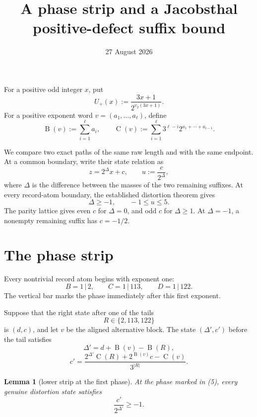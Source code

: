 \documentclass[11pt]{article}
\title{A phase strip and a Jacobsthal positive-defect suffix bound}
\author{}
\date{27 August 2026}
\newtheorem{lemma}[theorem]{Lemma}
\newcommand{\Up}{U_+}
\newcommand{\mass}{\operatorname{B}}
\newcommand{\car}{\operatorname{C}}
\begin{document}
\raggedbottom
\maketitle

For a positive odd integer \(x\), put
\[
 \Up(x):=\frac{3x+1}{2^{v_2(3x+1)}}.
 \tag{1}
\]
For a positive exponent word \(v=(a_1,\ldots,a_\ell)\), define
\[
 \mass(v):=\sum_{i=1}^{\ell}a_i,
 \qquad
 \car(v):=\sum_{i=1}^{\ell}
 3^{\ell-i}2^{a_1+\cdots+a_{i-1}}.
 \tag{2}
\]

We compare two exact paths of the same raw length and with the same
endpoint.  At a common boundary, write their state relation as
\[
 z=2^\Delta x+c,
 \qquad
 u:=\frac{c}{2^\Delta},
 \tag{3}
\]
where \(\Delta\) is the difference between the masses of the two
remaining suffixes.  At every record-atom boundary, the established
distortion theorem gives
\[
 \Delta\geq-1,
 \qquad
 -1\leq u\leq5.
 \tag{4}
\]
The parity lattice gives even \(c\) for \(\Delta=0\), and odd \(c\)
for \(\Delta\geq1\).  At \(\Delta=-1\), a nonempty remaining suffix
has \(c=-1/2\).

\section{The phase strip}

Every nontrivial record atom begins with exponent one:
\[
 B=1\,|\,2,\qquad
 C=1\,|\,113,\qquad
 D=1\,|\,122.
 \tag{5}
\]
The vertical bar marks the phase immediately after this first exponent.

Suppose that the right state after one of the tails
\[
 R\in\{2,113,122\}
 \tag{6}
\]
is \((d,c)\), and let \(v\) be the aligned alternative block.  The
state \((\Delta',c')\) before the tail satisfies
\[
 \Delta'=d+\mass(v)-\mass(R),
 \tag{7}
\]
\[
 c'=\frac{2^{\Delta'}\car(R)+2^{\mass(v)}c-\car(v)}
 {3^{|R|}}.
 \tag{8}
\]

\begin{lemma}[lower strip at the first phase]
At the phase marked in (5), every genuine distortion state satisfies
\[
 \boxed{\frac{c'}{2^{\Delta'}}\geq-1.}
 \tag{9}
\]
\end{lemma}
\end{document}
